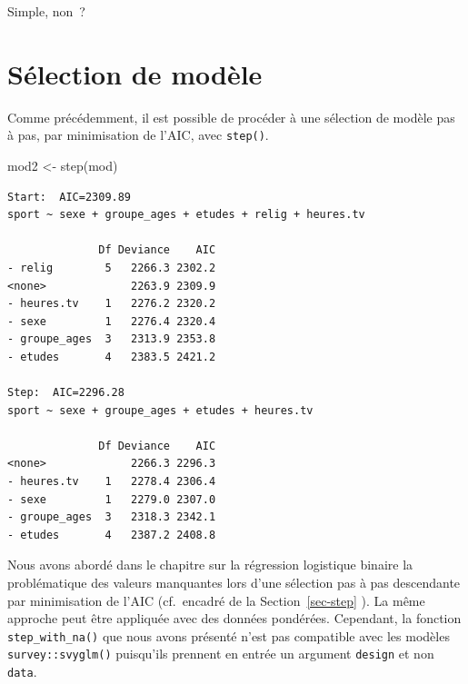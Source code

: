 \documentclass[
  letterpaper,
  DIV=11,
  numbers=noendperiod,
  oneside]{scrreprt}
\newenvironment{Shaded}{\begin{snugshade}}{\end{snugshade}}
\newcommand{\FunctionTok}[1]{\textcolor[rgb]{0.28,0.35,0.67}{#1}}
\newcommand{\NormalTok}[1]{\textcolor[rgb]{0.00,0.23,0.31}{#1}}
\newcommand{\OtherTok}[1]{\textcolor[rgb]{0.00,0.23,0.31}{#1}}
\begin{document}
Simple, non~?

\hypertarget{suxe9lection-de-moduxe8le}{%
\section{Sélection de modèle}\label{suxe9lection-de-moduxe8le}}

Comme précédemment, il est possible de procéder à une sélection de
modèle pas à pas, par minimisation de l'AIC, avec \texttt{step()}.

\begin{Shaded}
\begin{Highlighting}[]
\NormalTok{mod2 }\OtherTok{\textless{}{-}} \FunctionTok{step}\NormalTok{(mod)}
\end{Highlighting}
\end{Shaded}

\begin{verbatim}
Start:  AIC=2309.89
sport ~ sexe + groupe_ages + etudes + relig + heures.tv

              Df Deviance    AIC
- relig        5   2266.3 2302.2
<none>             2263.9 2309.9
- heures.tv    1   2276.2 2320.2
- sexe         1   2276.4 2320.4
- groupe_ages  3   2313.9 2353.8
- etudes       4   2383.5 2421.2

Step:  AIC=2296.28
sport ~ sexe + groupe_ages + etudes + heures.tv

              Df Deviance    AIC
<none>             2266.3 2296.3
- heures.tv    1   2278.4 2306.4
- sexe         1   2279.0 2307.0
- groupe_ages  3   2318.3 2342.1
- etudes       4   2387.2 2408.8
\end{verbatim}

\begin{tcolorbox}[enhanced jigsaw, colbacktitle=quarto-callout-warning-color!10!white, opacityback=0, toprule=.15mm, colback=white, coltitle=black, bottomtitle=1mm, toptitle=1mm, titlerule=0mm, rightrule=.15mm, title=\textcolor{quarto-callout-warning-color}{\faExclamationTriangle}\hspace{0.5em}{Sélection pas à pas et valeurs manquantes}, breakable, bottomrule=.15mm, opacitybacktitle=0.6, arc=.35mm, left=2mm, leftrule=.75mm, colframe=quarto-callout-warning-color-frame]

Nous avons abordé dans le chapitre sur la régression logistique binaire
la problématique des valeurs manquantes lors d'une sélection pas à pas
descendante par minimisation de l'AIC (cf.~encadré de la
Section~\ref{sec-step} ). La même approche peut être appliquée avec des
données pondérées. Cependant, la fonction \texttt{step\_with\_na()} que
nous avons présenté n'est pas compatible avec les modèles
\texttt{survey::svyglm()} puisqu'ils prennent en entrée un argument
\texttt{design} et non \texttt{data}.

\end{tcolorbox}
\end{document}
